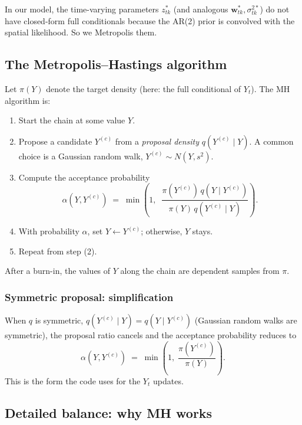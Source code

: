 \documentclass[11pt]{article}
\newcommand{\bw}{\mathbf{w}}
\theoremstyle{plain}
\theoremstyle{definition}
\theoremstyle{remark}
\begin{document}
In our model, the time-varying parameters $z^{*}_{tk}$ (and analogous
$\bw^{*}_{tk}, \sigma^{2*}_{tk}$) do not have closed-form full
conditionals because the AR(2) prior is convolved with the spatial
likelihood. So we Metropolis them.

\subsection{The Metropolis--Hastings algorithm}\label{sec:mh-algo}

Let $\pi(Y)$ denote the target density (here: the full conditional of
$Y_t$). The MH algorithm is:

\begin{enumerate}[label=(\arabic*)]
  \item Start the chain at some value $Y$.
  \item Propose a candidate $Y^{(c)}$ from a \emph{proposal density}
        $q(Y^{(c)} \mid Y)$. A common choice is a Gaussian random walk,
        $Y^{(c)} \sim N(Y, s^2)$.
  \item Compute the acceptance probability
        \begin{equation}\label{eq:alpha}
          \alpha(Y, Y^{(c)})
          \;=\; \min\!\left(1,\;\;
            \frac{\pi(Y^{(c)})\, q(Y \mid Y^{(c)})}
                 {\pi(Y)\, q(Y^{(c)} \mid Y)}
          \right).
        \end{equation}
  \item With probability $\alpha$, set $Y \leftarrow Y^{(c)}$; otherwise,
        $Y$ stays.
  \item Repeat from step (2).
\end{enumerate}
After a burn-in, the values of $Y$ along the chain are dependent samples
from $\pi$.

\subsubsection*{Symmetric proposal: simplification}

When $q$ is symmetric, $q(Y^{(c)} \mid Y) = q(Y \mid Y^{(c)})$ (Gaussian
random walks are symmetric), the proposal ratio cancels and the
acceptance probability reduces to
\begin{equation}\label{eq:alpha-sym}
  \alpha(Y, Y^{(c)})
  \;=\; \min\!\left(1,\; \frac{\pi(Y^{(c)})}{\pi(Y)}\right).
\end{equation}
This is the form the code uses for the $Y_t$ updates.

\subsection{Detailed balance: why MH works}\label{sec:db}
\end{document}
